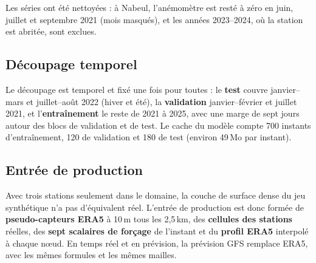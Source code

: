 Les séries ont été nettoyées : à Nabeul, l'anémomètre est resté à zéro en juin, juillet et
septembre 2021 (mois masqués), et les années 2023--2024, où la station est abritée, sont exclues.

\subsection{Découpage temporel}
Le découpage est temporel et fixé une fois pour toutes : le \textbf{test} couvre janvier--mars et
juillet--août 2022 (hiver et été), la \textbf{validation} janvier--février et juillet 2021, et
l'\textbf{entraînement} le reste de 2021 à 2025, avec une marge de sept jours autour des blocs de
validation et de test. Le cache du modèle compte 700 instants d'entraînement, 120 de validation et
180 de test (environ 49\,Mo par instant).

\subsection{Entrée de production}
Avec trois stations seulement dans le domaine, la couche de surface dense du jeu synthétique n'a
pas d'équivalent réel. L'entrée de production est donc formée de \textbf{pseudo-capteurs ERA5} à
10\,m tous les 2,5\,km, des \textbf{cellules des stations} réelles, des \textbf{sept scalaires de
forçage} de l'instant et du \textbf{profil ERA5} interpolé à chaque nœud. En temps réel et en
prévision, la prévision GFS remplace ERA5, avec les mêmes formules et les mêmes mailles.
